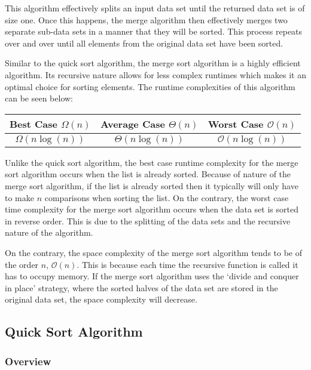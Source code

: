 \begin{highlight}
\noindent This algorithm effectively splits an input data set until the returned data set is of size one. Once this happens, the merge algorithm then effectively merges two separate sub-data sets in a manner that they will be sorted. This process repeats over and over until all elements from the original data set have been sorted.

Similar to the quick sort algorithm, the merge sort algorithm is a highly efficient algorithm. Its recursive nature allows for less complex runtimes which makes it an optimal choice for sorting elements. The runtime complexities of this algorithm can be seen below:

\begin{center}
    \begin{tabular}{|c|c|c|}
        \hline \textbf{Best Case $\Omega(n)$} & \textbf{Average Case $\Theta(n)$} & \textbf{Worst Case $\mathcal{O}(n)$} \\ \hline
        $\Omega(n\log{(n)})$ & $\Theta(n\log{(n)})$ & $\mathcal{O}(n\log{(n)})$ \\ \hline
    \end{tabular}
\end{center}

\noindent Unlike the quick sort algorithm, the best case runtime complexity for the merge sort algorithm occurs when the list is already sorted. Because of nature of the merge sort algorithm, if the list is already sorted then it typically will only have to make $n$ comparisons when sorting the list. On the contrary, the worst case time complexity
for the merge sort algorithm occurs when the data set is sorted in reverse order. This is due to the splitting of the data sets and the recursive nature of the algorithm. 

On the contrary, the space complexity of the merge sort algorithm tends to be of the order $n$, $\mathcal{O}(n)$. This is because each time the recursive function is called it has to occupy memory. If the merge sort algorithm uses the `divide and conquer in place' strategy, where the sorted halves of the data set are stored in the original data set, 
the space complexity will decrease.
\end{highlight}

\subsection*{Quick Sort Algorithm}

\subsubsection*{Overview}

